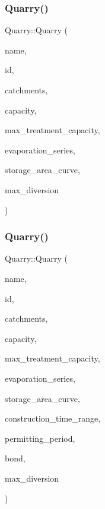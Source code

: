 \subsubsection{\texorpdfstring{Quarry()}{Quarry()}\hspace{0.1cm}{\footnotesize\ttfamily [1/5]}}
{\footnotesize\ttfamily Quarry\+::\+Quarry (\begin{DoxyParamCaption}\item[{const char $\ast$}]{name,  }\item[{const int}]{id,  }\item[{const vector$<$ \mbox{\hyperlink{classCatchment}{Catchment}} $\ast$$>$ \&}]{catchments,  }\item[{const double}]{capacity,  }\item[{const double}]{max\+\_\+treatment\+\_\+capacity,  }\item[{\mbox{\hyperlink{classEvaporationSeries}{Evaporation\+Series}} \&}]{evaporation\+\_\+series,  }\item[{\mbox{\hyperlink{classDataSeries}{Data\+Series}} $\ast$}]{storage\+\_\+area\+\_\+curve,  }\item[{double}]{max\+\_\+diversion }\end{DoxyParamCaption})}

\mbox{\label{classQuarry_a13cc1caeda6846900893f8d24c49b111_a13cc1caeda6846900893f8d24c49b111}} 
\subsubsection{\texorpdfstring{Quarry()}{Quarry()}\hspace{0.1cm}{\footnotesize\ttfamily [2/5]}}
{\footnotesize\ttfamily Quarry\+::\+Quarry (\begin{DoxyParamCaption}\item[{const char $\ast$}]{name,  }\item[{const int}]{id,  }\item[{const vector$<$ \mbox{\hyperlink{classCatchment}{Catchment}} $\ast$$>$ \&}]{catchments,  }\item[{const double}]{capacity,  }\item[{const double}]{max\+\_\+treatment\+\_\+capacity,  }\item[{\mbox{\hyperlink{classEvaporationSeries}{Evaporation\+Series}} \&}]{evaporation\+\_\+series,  }\item[{\mbox{\hyperlink{classDataSeries}{Data\+Series}} $\ast$}]{storage\+\_\+area\+\_\+curve,  }\item[{const vector$<$ double $>$ \&}]{construction\+\_\+time\+\_\+range,  }\item[{double}]{permitting\+\_\+period,  }\item[{\mbox{\hyperlink{classBond}{Bond}} \&}]{bond,  }\item[{double}]{max\+\_\+diversion }\end{DoxyParamCaption})}

